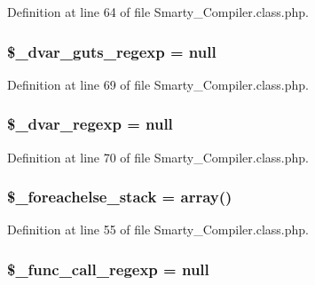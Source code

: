\-Definition at line 64 of file \-Smarty\-\_\-\-Compiler.\-class.\-php.

\hypertarget{class_smarty___compiler_a5b7a29ed6bbbdc9bdcaa44f93d22a76d}{
\subsubsection[{\$\-\_\-dvar\-\_\-guts\-\_\-regexp}]{\setlength{\rightskip}{0pt plus 5cm}\$\-\_\-dvar\-\_\-guts\-\_\-regexp = null}}\label{class_smarty___compiler_a5b7a29ed6bbbdc9bdcaa44f93d22a76d}


\-Definition at line 69 of file \-Smarty\-\_\-\-Compiler.\-class.\-php.

\hypertarget{class_smarty___compiler_a5ff515f2b5b83d226cc921c7329d3f5f}{
\subsubsection[{\$\-\_\-dvar\-\_\-regexp}]{\setlength{\rightskip}{0pt plus 5cm}\$\-\_\-dvar\-\_\-regexp = null}}\label{class_smarty___compiler_a5ff515f2b5b83d226cc921c7329d3f5f}


\-Definition at line 70 of file \-Smarty\-\_\-\-Compiler.\-class.\-php.

\hypertarget{class_smarty___compiler_ad5818b75883060629ca8ecaf96a78c78}{
\subsubsection[{\$\-\_\-foreachelse\-\_\-stack}]{\setlength{\rightskip}{0pt plus 5cm}\$\-\_\-foreachelse\-\_\-stack = array()}}\label{class_smarty___compiler_ad5818b75883060629ca8ecaf96a78c78}


\-Definition at line 55 of file \-Smarty\-\_\-\-Compiler.\-class.\-php.

\hypertarget{class_smarty___compiler_a88351b1d42a225274bf2030747f987a0}{
\subsubsection[{\$\-\_\-func\-\_\-call\-\_\-regexp}]{\setlength{\rightskip}{0pt plus 5cm}\$\-\_\-func\-\_\-call\-\_\-regexp = null}}\label{class_smarty___compiler_a88351b1d42a225274bf2030747f987a0}


